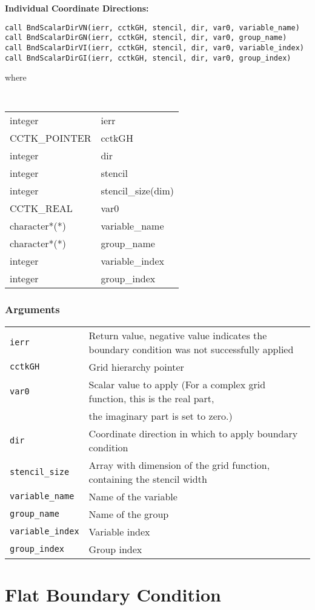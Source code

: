 \documentclass{article}
\begin{document}
\noindent
{\bf Individual Coordinate Directions:}
\begin{verbatim}
call BndScalarDirVN(ierr, cctkGH, stencil, dir, var0, variable_name)
call BndScalarDirGN(ierr, cctkGH, stencil, dir, var0, group_name)
call BndScalarDirVI(ierr, cctkGH, stencil, dir, var0, variable_index)
call BndScalarDirGI(ierr, cctkGH, stencil, dir, var0, group_index)
\end{verbatim}
where

{\tt
\begin{tabular}{ll}
integer & ierr \\
CCTK\_POINTER & cctkGH\\
integer & dir\\
integer & stencil\\
integer & stencil\_size(dim)\\
CCTK\_REAL & var0 \\
character*(*) & variable\_name\\
character*(*) & group\_name\\
integer & variable\_index\\
integer & group\_index
\end{tabular}
}

\subsubsection*{Arguments}
\begin{tabular}{ll}
\texttt{ierr} & Return value, negative value indicates the
boundary condition was not successfully applied\\
{\tt cctkGH} & Grid hierarchy pointer\\
{\tt var0} & Scalar value to apply  (For a complex grid function, this is the real part, \\
& the imaginary part is set to zero.)\\
{\tt dir} & Coordinate direction in which to apply boundary condition\\
{\tt stencil\_size} & Array with dimension of the grid function, containing the stencil width\\
{\tt variable\_name} & Name of the variable\\
{\tt group\_name} & Name of the group\\
{\tt variable\_index} & Variable index\\
{\tt group\_index} & Group index
\end{tabular}


\section{Flat Boundary Condition}
\end{document}
